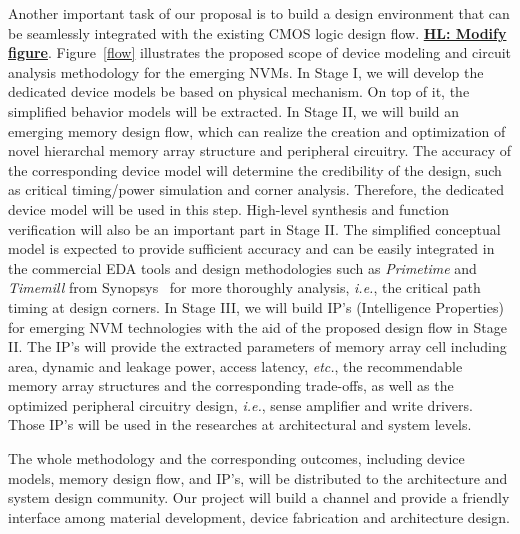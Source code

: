 Another important task of our proposal is to build a design environment that can be seamlessly integrated with the existing CMOS logic design flow. \textbf{\underline{HL: Modify figure}}. Figure~\ref{flow} illustrates the proposed scope of device modeling and circuit analysis methodology for the emerging NVMs. In Stage I, we will develop the dedicated device models be based on physical mechanism. On top of it, the simplified behavior models will be extracted. In Stage II, we will build an emerging memory design flow, which can realize the creation and optimization of novel hierarchal memory array structure and peripheral circuitry. The accuracy of the corresponding device model will determine the credibility of the design, such as critical timing/power simulation and corner analysis. Therefore, the dedicated device model will be used in this step. High-level synthesis and function verification will also be an important part in Stage II. The simplified conceptual model is expected to provide sufficient accuracy and %
can be easily integrated in the commercial EDA tools and design methodologies such as \emph{Primetime} and \emph{Timemill} from Synopsys~\cite{synopsys} for more thoroughly analysis, \emph{i.e.}, the critical path timing at design corners. In Stage III, we will build IP's (Intelligence Properties) for emerging NVM technologies with the aid of the proposed design flow in Stage II. The IP's will provide the extracted parameters of memory array cell including area, dynamic and leakage power, access latency, \emph{etc.}, the recommendable memory array structures and the corresponding trade-offs, as well as the optimized peripheral circuitry design, \emph{i.e.}, sense amplifier and write drivers. Those IP's will be used in the researches at architectural and system levels.

The whole methodology and the corresponding outcomes, including device models, memory design flow, and IP's, will be distributed to the architecture and system design community. Our project will build a channel and provide a friendly interface among material development, device fabrication and architecture design.


